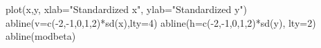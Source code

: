 \begin{Schunk}
\begin{Sinput}
 plot(x,y, xlab="Standardized x", ylab="Standardized y")
 abline(v=c(-2,-1,0,1,2)*sd(x),lty=4)
 abline(h=c(-2,-1,0,1,2)*sd(y), lty=2)
 abline(modbeta)
\end{Sinput}
\end{Schunk}
